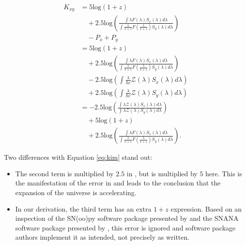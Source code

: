 \begin{equation}
\begin{aligned}
  K_{xy} &= 5 \text{log} (1 + z) \\
          &\quad + 2.5 \text{log} \left(
              \frac{\int \lambda F(\lambda) S_x(\lambda) d\lambda}
                   {\int \frac{\lambda}{1+z} F\left(\frac{\lambda}{1+z}\right) S_y(\lambda) d\lambda} \right) \\
          &\quad - P_x + P_y \\
         &= 5 \text{log} (1 + z) \\
          &\quad + 2.5 \text{log} \left(
              \frac{\int \lambda F(\lambda) S_x(\lambda) d\lambda}
                   {\int \frac{\lambda}{1+z} F\left(\frac{\lambda}{1+z}\right) S_y(\lambda) d\lambda} \right) \\
          &\quad - 2.5 \text{log} \left( \int \frac{\lambda}{hc} \mathcal{Z}(\lambda) S_x(\lambda) d\lambda \right) \\
          &\quad + 2.5 \text{log} \left( \int \frac{\lambda}{hc} \mathcal{Z}(\lambda) S_y(\lambda) d\lambda \right) \\
         &= -2.5 \text{log} \left(
              \frac{\int \lambda \mathcal{Z}(\lambda) S_x(\lambda) d\lambda}
                   {\int \lambda \mathcal{Z}(\lambda) S_y(\lambda) d\lambda}
             \right) \\
          &\quad + 5 \text{log} (1 + z) \\
          &\quad + 2.5 \text{log} \left(
              \frac{\int \lambda F(\lambda) S_x(\lambda) d\lambda}
                   {\int \frac{\lambda}{1+z} F\left(\frac{\lambda}{1+z}\right) S_y(\lambda) d\lambda} \right) .
\end{aligned}
\end{equation}

Two differences with Equation \ref{eq:kim} stand out:

\begin{itemize}
  \item The second term is multiplied by $2.5$ in \citet{kim1996}, but is
  multiplied by $5$ here. This is the manifestation of the error in
  \citet{tolman1930} and leads to the conclusion that the expansion of the
  universe is accelerating.

  \item In our derivation, the third term has an extra $1 + z$ expression.
  Based on an inspection of the SN(oo)py software package presented by
  \citet{burns2010} and the SNANA software package presented by
  \citet{kessler2009}, this error is ignored and software package authors
  implement it as intended, not precisely as written.
\end{itemize}

